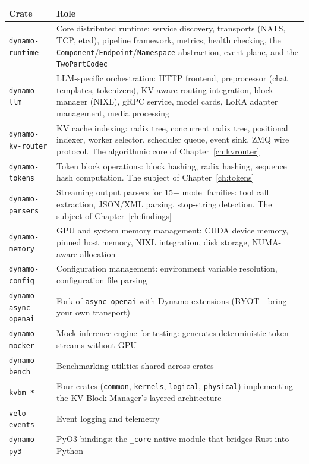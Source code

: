 \begin{center}
\small
\begin{tabular}{p{3.5cm}p{8.8cm}}
\toprule
\textbf{Crate} & \textbf{Role} \\
\midrule
\texttt{dynamo-runtime} & Core distributed runtime: service discovery, transports (NATS, TCP, etcd), pipeline framework, metrics, health checking, the \texttt{Component}/\texttt{Endpoint}/\texttt{Namespace} abstraction, event plane, and the \texttt{TwoPartCodec} \\
\texttt{dynamo-llm} & LLM-specific orchestration: HTTP frontend, preprocessor (chat templates, tokenizers), KV-aware routing integration, block manager (NIXL), gRPC service, model cards, LoRA adapter management, media processing \\
\texttt{dynamo-kv-router} & KV cache indexing: radix tree, concurrent radix tree, positional indexer, worker selector, scheduler queue, event sink, ZMQ wire protocol. The algorithmic core of Chapter~\ref{ch:kvrouter} \\
\texttt{dynamo-tokens} & Token block operations: block hashing, radix hashing, sequence hash computation. The subject of Chapter~\ref{ch:tokens} \\
\texttt{dynamo-parsers} & Streaming output parsers for 15+ model families: tool call extraction, JSON/XML parsing, stop-string detection. The subject of Chapter~\ref{ch:findings} \\
\texttt{dynamo-memory} & GPU and system memory management: CUDA device memory, pinned host memory, NIXL integration, disk storage, NUMA-aware allocation \\
\texttt{dynamo-config} & Configuration management: environment variable resolution, configuration file parsing \\
\texttt{dynamo-async-openai} & Fork of \texttt{async-openai} with Dynamo extensions (BYOT---bring your own transport) \\
\texttt{dynamo-mocker} & Mock inference engine for testing: generates deterministic token streams without GPU \\
\texttt{dynamo-bench} & Benchmarking utilities shared across crates \\
\texttt{kvbm-*} & Four crates (\texttt{common}, \texttt{kernels}, \texttt{logical}, \texttt{physical}) implementing the KV Block Manager's layered architecture \\
\texttt{velo-events} & Event logging and telemetry \\
\texttt{dynamo-py3} & PyO3 bindings: the \texttt{\_core} native module that bridges Rust into Python \\
\bottomrule
\end{tabular}
\end{center}

